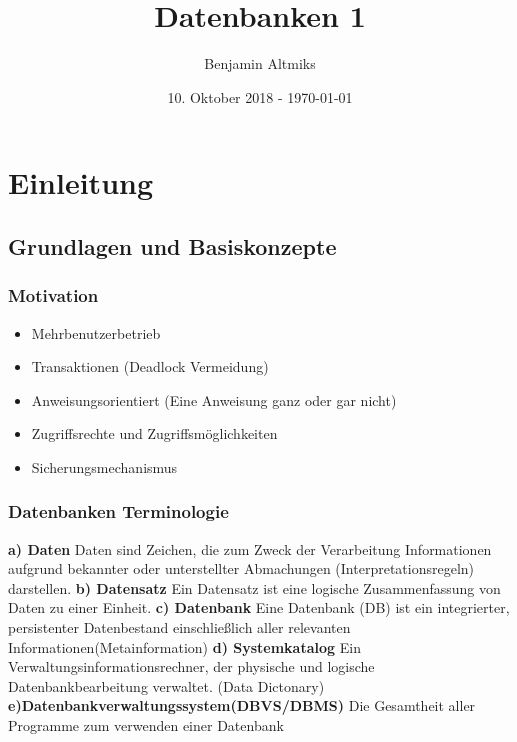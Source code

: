 \documentclass[a4paper,10pt]{scrartcl}
\title{Datenbanken 1}
\author{Benjamin Altmiks}
\date{10. Oktober 2018 - \today}
\begin{document}
\maketitle
\tableofcontents
\newpage
\section{Einleitung}
\subsection{Grundlagen und Basiskonzepte}
\subsubsection{Motivation}

\begin{itemize}
    \item Mehrbenutzerbetrieb
    \item Transaktionen (Deadlock Vermeidung) 
    \item Anweisungsorientiert (Eine Anweisung ganz oder gar nicht)
    \item Zugriffsrechte und Zugriffsmöglichkeiten
    \item Sicherungsmechanismus
\end{itemize}
\subsubsection{Datenbanken Terminologie}
\textbf{a) Daten}\newline
Daten sind Zeichen, die zum Zweck der Verarbeitung Informationen aufgrund bekannter oder unterstellter Abmachungen (Interpretationsregeln) darstellen.\newline
\textbf{b) Datensatz}\newline
Ein Datensatz ist eine logische Zusammenfassung von Daten zu einer Einheit.\newline
\textbf{c) Datenbank}\newline
Eine Datenbank (DB) ist ein integrierter, persistenter Datenbestand einschließlich aller relevanten Informationen(Metainformation)\newline
\textbf{d) Systemkatalog}\newline
Ein Verwaltungsinformationsrechner, der physische und logische Datenbankbearbeitung verwaltet. (Data Dictonary)\newline
\textbf{e)Datenbankverwaltungssystem(DBVS/DBMS)}\newline
Die Gesamtheit aller Programme zum verwenden einer Datenbank\newline
\end{document}
